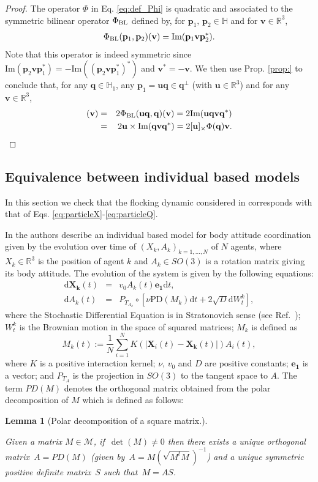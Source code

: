 \documentclass[12pt]{article}
\def\R{\mathbb{R}}
\newtheorem{lemma}[theorem]{Lemma}
\newcommand{\beqar}{\begin{eqnarray*}}
\newcommand{\eeqar}{\end{eqnarray*}}
\newcommand{\be}{\begin{equation}}
\newcommand{\ee}{\end{equation}}
\newcommand{\vezero}{\mathbf{e_{1}}}
\newcommand{\uu}{\mathbf{u}}
\newcommand{\vv}{\mathbf{v}}
\newcommand{\PD}{\mbox{PD}}
\newcommand{\ud}{\mathrm{d}}
\newcommand{\unitq}{{\mathbb{H}_1}}
\newcommand{\Ima}{\mbox{Im}}
\newcommand{\q}{\mathbf{q}}
\newcommand{\p}{\mathbf{p}}
\begin{document}
 \begin{proof}
The operator $\Phi$ in Eq. \eqref{eq:def_Phi} is quadratic and associated to the symmetric bilinear operator $\Phi_{\textnormal{BL}}$ defined by, for $\p_1,\,\p_2 \in \mathbb{H}$ and for $\vv\in\R^3$,
\beqar
\Phi_{\textnormal{BL}} (\p_1,\p_2) (\vv)= \Ima (\p_1 \vv\p_2^*).
\eeqar
Note that this operator is indeed symmetric since $\Ima (\p_2 \vv\p_1^*)= -\Ima ((\p_2 \vv\p_1^*)^*)$ and $\vv^*=-\vv$. We then use Prop. \ref{prop:} to conclude that, for any $\q\in\unitq$, any $\p_1=\uu\q \in \q^\perp$ (with $\uu\in\R^3$) and for any $\vv\in\R^3$,
\beqar
[\textnormal{D}_\q \Phi \, (\uu\q)] (\vv) &=& 2 \Phi_\textnormal{BL}(\uu\q,\q) (\vv) = 2\Ima (\uu\q \vv\q^*)\\
&=& 2 \uu\times \Ima (\q \vv\q^*) = 2 [\uu]_\times \Phi(\q) \vv .
\eeqar
 \end{proof}


\subsection{Equivalence between individual based models}
\label{sec:compare_micro}


In this section we check that the flocking dynamic considered in \cite{bodyattitude} corresponds with that of Eqs. \eqref{eq:particleX}-\eqref{eq:particleQ}.

In \cite{bodyattitude} the authors describe an individual based model for body attitude coordination given by the evolution over time of $(X_k, A_k)_{k=1,\hdots,N}$ of $N$ agents,  where $X_k\in \R^3$ is the position of agent $k$ and $A_k\in SO(3)$ is a rotation matrix giving its body attitude. The evolution of the system is given by the following equations:
\begin{eqnarray} \label{eq:IBM_rotation}
	\ud\mathbf{X_k}(t) &=& v_0 A_k(t) \vezero \ud t,\\
	\ud A_k(t) &=& P_{T_{A_k}} \circ \left[ \nu \PD(M_k) \ud t + 2\sqrt{D} \ud W^k_t \right], \label{eq:IBM2_rotation}
\end{eqnarray}
where the Stochastic Differential Equation is in  Stratonovich sense (see Ref.~\cite{gardiner}); $W_t^k$ is the Brownian motion in the space of squared matrices; $M_k$ is defined as
\be \label{eq:Mk}
   M_k(t) := \frac{1}{N}\sum_{i=1}^N K(|\mathbf{X}_i(t)-\mathbf{X_k}(t)|) A_i(t),
\ee
where $K$ is a positive interaction kernel;
 $\nu$, $v_0$ and $D$ are positive constants; $\vezero$ is a vector; and $P_{T_A}$ is the projection in $SO(3)$ to the tangent space to $A$.
The term $PD(M)$ denotes the orthogonal matrix obtained from the polar decomposition of $M$ which is defined as follows:
\begin{lemma}[Polar decomposition of a square matrix.\cite{golub2012matrix}]~
\label{lem:polar_decomposition}

Given a matrix $M\in \mathcal{M}$, if~$\det(M)\neq 0$ then there exists a unique orthogonal matrix~$A=PD(M)$ (given by~$A= M(\sqrt{M^tM})^{-1}$) and a unique symmetric positive definite matrix~$S$ such that~$M=AS$.
\end{lemma}
\end{document}
